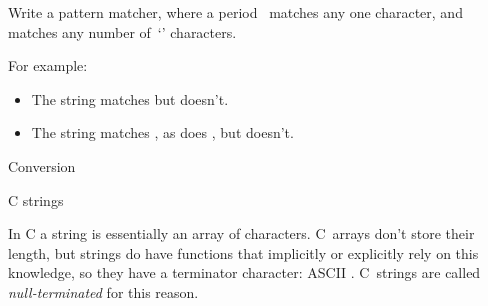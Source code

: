\begin{exercise}
  Write a pattern matcher, where a period~ matches any one
  character, and  matches any number of~`' characters.

  For example:
  \begin{itemize}
  \item The string  matches  but  doesn't.
  \item The string  matches , as does , but
     doesn't.
  \end{itemize}
\end{exercise}

 {Conversion}


 {C strings}
\label{sec:cstring}

In C a string is essentially an array of characters. C~arrays don't
store their length, but strings do have functions that implicitly or
explicitly rely on this knowledge, so they have a terminator
character: ASCII . C~strings are called
\emph{null-terminated} for this reason.

